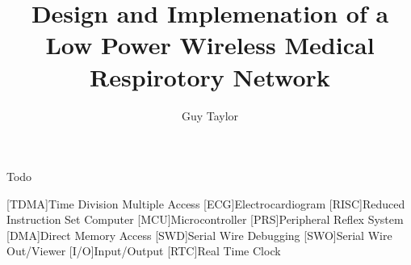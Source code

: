 \documentclass[bsc,logo,plainprepages,parskip,abbrevs,10pt]{infthesis}
\title{Design and Implemenation of a Low Power Wireless Medical Respirotory Network}
\author{Guy Taylor}
\begin{document}
\begin{preliminary}

\maketitle

\begin{acknowledgements}
  Todo
\end{acknowledgements}

\standarddeclaration

\tableofcontents

\listoffigures
\listoftables

\begin{acronym}
[TDMA]{Time Division Multiple Access}
[ECG]{Electrocardiogram}
[RISC]{Reduced Instruction Set Computer}
[MCU]{Microcontroller}
[PRS]{Peripheral Reflex System}
[DMA]{Direct Memory Access}
[SWD]{Serial Wire Debugging}
[SWO]{Serial Wire Out/Viewer}
[I/O]{Input/Output}
[RTC]{Real Time Clock}
\end{acronym}

\end{preliminary}









\appendix








\end{document}
